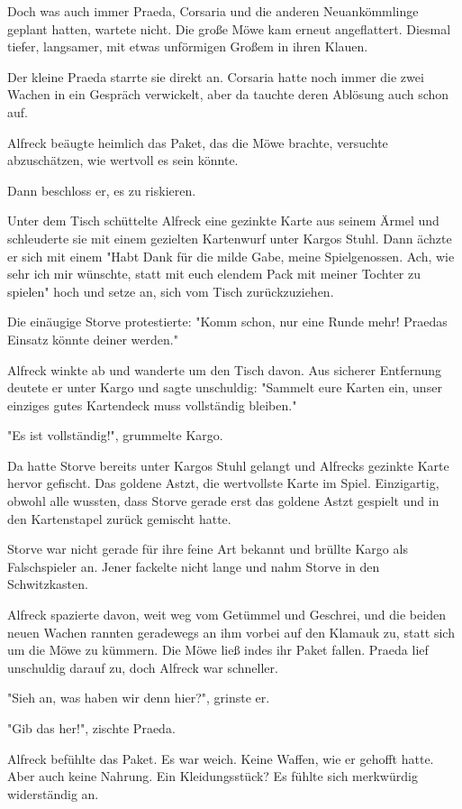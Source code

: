 Doch was auch immer Praeda, Corsaria und die anderen Neuankömmlinge geplant hatten, wartete nicht. Die große Möwe kam erneut angeflattert. Diesmal tiefer, langsamer, mit etwas unförmigen Großem in ihren Klauen. 

Der kleine Praeda starrte sie direkt an. Corsaria hatte noch immer die zwei Wachen in ein Gespräch verwickelt, aber da tauchte deren Ablösung auch schon auf.

Alfreck beäugte heimlich das Paket, das die Möwe brachte, versuchte abzuschätzen, wie wertvoll es sein könnte.

Dann beschloss er, es zu riskieren.

Unter dem Tisch schüttelte Alfreck eine gezinkte Karte aus seinem Ärmel und schleuderte sie mit einem gezielten Kartenwurf unter Kargos Stuhl. Dann ächzte er sich mit einem "Habt Dank für die milde Gabe, meine Spielgenossen. Ach, wie sehr ich mir wünschte, statt mit euch elendem Pack mit meiner Tochter zu spielen" hoch und setze an, sich vom Tisch zurückzuziehen. 

Die einäugige Storve protestierte: "Komm schon, nur eine Runde mehr! Praedas Einsatz könnte deiner werden." 

Alfreck winkte ab und wanderte um den Tisch davon. Aus sicherer Entfernung deutete er unter Kargo und sagte unschuldig: "Sammelt eure Karten ein, unser einziges gutes Kartendeck muss vollständig bleiben."

"Es ist vollständig!", grummelte Kargo.

Da hatte Storve bereits unter Kargos Stuhl gelangt und Alfrecks gezinkte Karte hervor gefischt. Das goldene Astzt, die wertvollste Karte im Spiel. Einzigartig, obwohl alle wussten, dass Storve gerade erst das goldene Astzt gespielt und in den Kartenstapel zurück gemischt hatte. 

Storve war nicht gerade für ihre feine Art bekannt und brüllte Kargo als Falschspieler an. Jener fackelte nicht lange und nahm Storve in den Schwitzkasten.
 
Alfreck spazierte davon, weit weg vom Getümmel und Geschrei, und die beiden neuen Wachen rannten geradewegs an ihm vorbei auf den Klamauk zu, statt sich um die Möwe zu kümmern. Die Möwe ließ indes ihr Paket fallen. Praeda lief unschuldig darauf zu, doch Alfreck war schneller.

"Sieh an, was haben wir denn hier?", grinste er.

"Gib das her!", zischte Praeda.

Alfreck befühlte das Paket. Es war weich. Keine Waffen, wie er gehofft hatte. Aber auch keine Nahrung. Ein Kleidungsstück? Es fühlte sich merkwürdig widerständig an.


